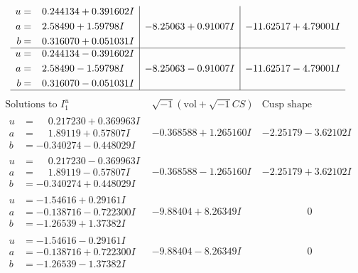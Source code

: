 \documentclass[1p]{elsarticle_modified}
\theoremstyle{definition}
\newcommand{\I}{\sqrt{-1}}
\begin{document}
$$\begin{array}{c|c|c}
\begin{aligned}
u &= \phantom{-}0.244134 + 0.391602 I \\
a &= \phantom{-}2.58490 + 1.59798 I \\
b &= \phantom{-}0.316070 + 0.051031 I\end{aligned}
 & -8.25063 + 0.91007 I & -11.62517 + 4.79001 I \\ \hline\begin{aligned}
u &= \phantom{-}0.244134 - 0.391602 I \\
a &= \phantom{-}2.58490 - 1.59798 I \\
b &= \phantom{-}0.316070 - 0.051031 I\end{aligned}
 & -8.25063 - 0.91007 I & -11.62517 - 4.79001 I\\
 \hline 
 \end{array}$$\newpage$$\begin{array}{c|c|c}  
\text{Solutions to }I^u_{1}& \I (\text{vol} + \sqrt{-1}CS) & \text{Cusp shape}\\
 \hline 
\begin{aligned}
u &= \phantom{-}0.217230 + 0.369963 I \\
a &= \phantom{-}1.89119 + 0.57807 I \\
b &= -0.340274 - 0.448029 I\end{aligned}
 & -0.368588 + 1.265160 I & -2.25179 - 3.62102 I \\ \hline\begin{aligned}
u &= \phantom{-}0.217230 - 0.369963 I \\
a &= \phantom{-}1.89119 - 0.57807 I \\
b &= -0.340274 + 0.448029 I\end{aligned}
 & -0.368588 - 1.265160 I & -2.25179 + 3.62102 I \\ \hline\begin{aligned}
u &= -1.54616 + 0.29161 I \\
a &= -0.138716 - 0.722300 I \\
b &= -1.26539 + 1.37382 I\end{aligned}
 & -9.88404 + 8.26349 I & \phantom{-0.000000 } 0 \\ \hline\begin{aligned}
u &= -1.54616 - 0.29161 I \\
a &= -0.138716 + 0.722300 I \\
b &= -1.26539 - 1.37382 I\end{aligned}
 & -9.88404 - 8.26349 I & \phantom{-0.000000 } 0 \\ \hline\begin{aligned}

\end{aligned}
\end{array}$$
\end{document}
